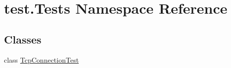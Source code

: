 \hypertarget{namespacetest_1_1Tests}{}\section{test.\+Tests Namespace Reference}
\label{namespacetest_1_1Tests}
\subsection*{Classes}
\begin{DoxyCompactItemize}
\item 
class \hyperlink{classtest_1_1Tests_1_1TcpConnectionTest}{Tcp\+Connection\+Test}
\end{DoxyCompactItemize}
